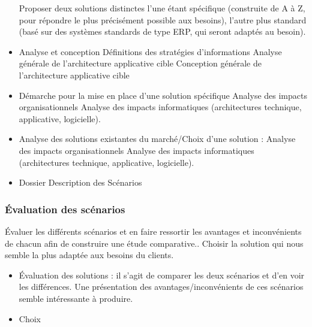 {
\begin{itemize}
    \item[Proposer deux solutions distinctes]{
        l’une étant spécifique (construite de A à Z, pour répondre le plus précisément possible aux besoins), l’autre plus standard (basé sur des systèmes standards de type ERP, qui seront adaptés au besoin).
    }
\end{itemize}


\begin{itemize}
    \item Analyse et conception
        \subitem Définitions des stratégies d’informations
        \subitem Analyse générale de l’architecture applicative cible
        \subitem Conception générale de l’architecture applicative cible
    \item Démarche pour la mise en place d’une solution spécifique
        \subitem Analyse des impacts organisationnels
        \subitem Analyse des impacts informatiques (architectures technique, applicative, logicielle).
    \item Analyse  des solutions existantes du marché/Choix d’une solution :
        \subitem Analyse des impacts organisationnels
        \subitem Analyse des impacts informatiques (architectures technique, applicative, logicielle).
\end{itemize}

\begin{itemize}
    \item Dossier Description des Scénarios
\end{itemize}

\subsubsection{Évaluation des scénarios}

\begin{itemize}
    Évaluer les différents scénarios et en faire ressortir les avantages et inconvénients de chacun afin de construire une étude comparative..
    Choisir la solution qui nous semble la plus adaptée aux besoins du clients.
\end{itemize}

\begin{itemize}
    \item Évaluation des solutions : il s’agit de comparer les deux scénarios et d’en voir les différences. Une présentation des avantages/inconvénients de ces scénarios semble intéressante à produire.
    \item Choix 
\end{itemize}

}
